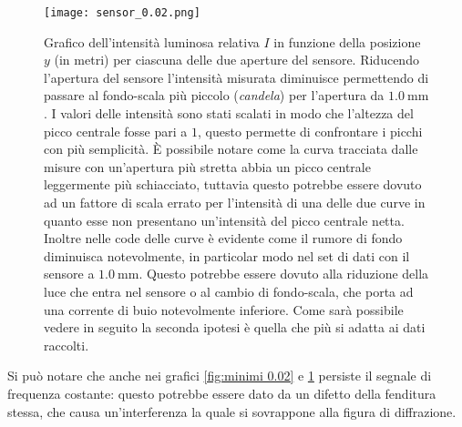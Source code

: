 \documentclass[../main.tex]{subfiles}
\begin{document}
\begin{figure}[ht!]
    \centering
    \texttt{[image: sensor\_0.02.png]}
    \caption{Grafico dell'intensità luminosa relativa $I$ in funzione della posizione $y$ (in metri) per ciascuna delle due aperture del sensore.
        Riducendo l'apertura del sensore l'intensità misurata diminuisce permettendo di passare al fondo-scala più piccolo (\textit{candela}) per l'apertura da $\qty{1.0}{\mm}$.
        I valori delle intensità sono stati scalati in modo che l'altezza del picco centrale fosse pari a $1$, questo permette di confrontare i picchi con più semplicità. È possibile notare come la curva tracciata dalle misure con un'apertura più stretta abbia un picco centrale leggermente più schiacciato, tuttavia questo potrebbe essere dovuto ad un fattore di scala errato per l'intensità di una delle due curve in quanto esse non presentano un'intensità del picco centrale netta.
        Inoltre nelle code delle curve è evidente come il rumore di fondo diminuisca notevolmente, in particolar modo nel set di dati con il sensore a $\qty{1.0}{\mm}$. Questo potrebbe essere dovuto alla riduzione della luce che entra nel sensore o al cambio di fondo-scala, che porta ad una corrente di buio notevolmente inferiore. %
        Come sarà possibile vedere in seguito la seconda ipotesi è quella che più si adatta ai dati raccolti.} %
    \label{fig:sensore 0.02}
\end{figure}

Si può notare che anche nei grafici \ref{fig:minimi 0.02} e \ref{fig:sensore 0.02} persiste il segnale di frequenza costante: questo potrebbe essere dato da un difetto della fenditura stessa, che causa un'interferenza la quale si sovrappone alla figura di diffrazione.
\end{document}
